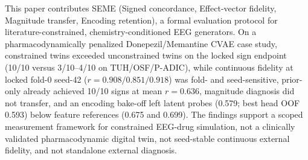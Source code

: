 This paper contributes SEME (Signed concordance, Effect-vector fidelity, Magnitude transfer, Encoding retention), a formal evaluation protocol for literature-constrained, chemistry-conditioned EEG generators. On a pharmacodynamically penalized Donepezil/Memantine CVAE case study, constrained twins exceeded unconstrained twins on the locked sign endpoint (10/10 versus 3/10--4/10 on TUH/OSF/P-ADIC), while continuous fidelity at locked fold-0 seed-42 (\(r=0.908/0.851/0.918\)) was fold- and seed-sensitive, prior-only already achieved 10/10 signs at mean \(r=0.636\), magnitude diagnosis did not transfer, and an encoding bake-off left latent probes (0.579; best head OOF 0.593) below feature references (0.675 and 0.699). The findings support a scoped measurement framework for constrained EEG-drug simulation, not a clinically validated pharmacodynamic digital twin, not seed-stable continuous external fidelity, and not standalone external diagnosis.
